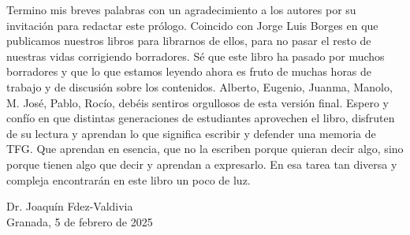 Termino mis breves palabras con un agradecimiento a los autores por su invitación para redactar este prólogo. Coincido con Jorge Luis Borges en que publicamos nuestros libros para librarnos de ellos, para no pasar el resto de nuestras vidas corrigiendo borradores. Sé que este libro ha pasado por muchos borradores y que lo que estamos leyendo ahora es fruto de muchas horas de trabajo y de discusión sobre los contenidos. Alberto, Eugenio, Juanma, Manolo, M. José, Pablo, Rocío, debéis sentiros orgullosos de esta versión final. Espero y confío en que distintas generaciones de estudiantes aprovechen el libro, disfruten de su lectura y aprendan lo que significa escribir y defender una memoria de TFG. Que aprendan en esencia, que no la escriben porque quieran decir algo, sino porque tienen algo que decir y aprendan a expresarlo. En esa tarea tan diversa y compleja encontrarán en este libro un poco de luz.



\begin{flushright}
Dr. Joaquín Fdez-Valdivia \\                            
Granada, 5 de febrero de 2025
\end{flushright}